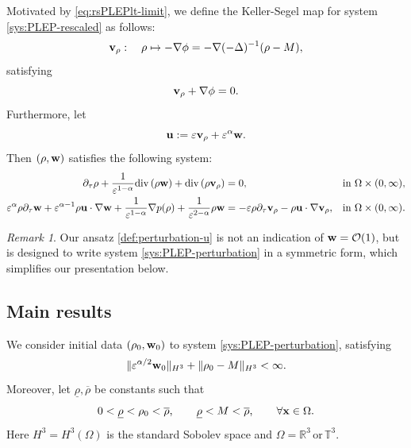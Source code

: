 \documentclass[11pt]{article}
\theoremstyle{plain}
\theoremstyle{definition}
\theoremstyle{remark}
\newtheorem{remark}[theorem]{Remark}
\newcommand{\dtau}{\partial_\tau}
\newcommand{\dv}{\mathrm{div}\, }
\renewcommand{\vec}[1]{{\bf #1}}
\newcommand{\norm}[2]{\Vert #1 \Vert_{#2}}
\numberwithin{equation}{section}
\begin{document}
Motivated by \eqref{eq:rsPLEPlt-limit}, we define the Keller-Segel map for system \eqref{sys:PLEP-rescaled} as follows:
\begin{equation}
    \label{def:KS-map}
    \vec v_\rho: \quad \rho \mapsto  - \nabla \phi = - \nabla (-\Delta)^{-1} (\rho -M),
\end{equation}
satisfying 
\begin{equation}
    \label{def:KS-map-2}
     \vec v_\rho + \nabla \phi = 0.
\end{equation}
Furthermore, let 
\begin{equation}
    \label{def:perturbation-u}
    \vec u := \varepsilon \vec v_\rho + \varepsilon^{\alpha} \vec w.
\end{equation}
Then $ (\rho, \vec w) $ satisfies the following system:
\begin{subequations}
    \label{sys:PLEP-perturbation}
    \begin{align}
        \label{eq:ptb-01}
        \dtau \rho + \frac{1}{\varepsilon^{1-\alpha}} \dv(\rho \vec w) + \dv (\rho \vec v_\rho) & = 0, & \text{in} \ \Omega \times (0,\infty), \\
        \label{eq:ptb-02}
        \varepsilon^\alpha \rho \dtau \vec w + \varepsilon^{\alpha -1} \rho \vec u \cdot \nabla \vec w + \frac{1}{\varepsilon^{1-\alpha}}\nabla p(\rho) + \frac{1}{\varepsilon^{2-\alpha}} \rho \vec w & = -  \varepsilon \rho \dtau \vec v_\rho - \rho \vec u \cdot \nabla \vec v_\rho, & \text{in} \ \Omega \times (0,\infty).
    \end{align}
\end{subequations}

\begin{remark}
    Our ansatz \eqref{def:perturbation-u} is not an indication of $ \vec w = \mathcal O(1) $, but is designed to write system \eqref{sys:PLEP-perturbation} in a symmetric form, which simplifies our presentation below. 
\end{remark}


\subsection{Main results}
\label{sec:main-results}
We consider initial data $ (\rho_0, \vec w_0 ) $ to system \eqref{sys:PLEP-perturbation}, satisfying 
\begin{equation}
    \label{initial:000}
    \norm{\varepsilon^{\alpha/2} \vec w_0}{H^3} + \norm{\rho_0-M}{H^3} < \infty. 
\end{equation}
Moreover, let $ \underline\rho, \overline\rho$ be constants such that
\begin{equation}
    \label{initial:001}
    0 < \underline\rho < \rho_0 < \overline \rho,  \qquad \underline\rho < M < \overline \rho, \qquad \forall \vec x \in \Omega. 
\end{equation}
Here $ H^3 = H^3(\Omega) $ is the standard Sobolev space and $ \Omega = \mathbb R^3 \, \text{or} \, \mathbb T^3 $.
\end{document}
